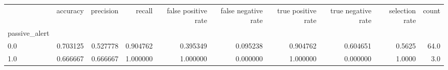 \begin{tabular}{lrrrrrrrrr}
\toprule
{} &  accuracy &  precision &    recall &  false positive rate &  false negative rate &  true positive rate &  true negative rate &  selection rate &  count \\
passive\_alert &           &            &           &                      &                      &                     &                     &                 &        \\
\midrule
0.0           &  0.703125 &   0.527778 &  0.904762 &             0.395349 &             0.095238 &            0.904762 &            0.604651 &          0.5625 &   64.0 \\
1.0           &  0.666667 &   0.666667 &  1.000000 &             1.000000 &             0.000000 &            1.000000 &            0.000000 &          1.0000 &    3.0 \\
\bottomrule
\end{tabular}
